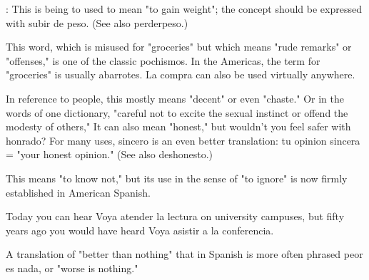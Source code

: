  : This is being to used to mean "to gain
weight"; the concept should be expressed with subir de peso. (See
also perderpeso.)

 This word, which is misused for "groceries" but
which means "rude remarks" or "offenses," is one of the classic pochismos. In the Americas, the term for "groceries" is usually abarrotes. La compra can also be used virtually anywhere.

 In reference to people, this mostly means "decent"
or even "chaste." Or in the words of one dictionary, "careful not to excite the sexual instinct or offend the modesty of others," It can also
mean "honest," but wouldn't you feel safer with honrado? For many
uses, sincero is an even better translation: tu opinion sincera = "your
honest opinion." (See also deshonesto.)

 This means "to know not," but its use in the sense
of "to ignore" is now firmly established in American Spanish.

 Today you can hear Voya atender la lectura on
university campuses, but fifty years ago you would have heard Voya
asistir a la conferencia.

 A translation of "better than nothing"
that in Spanish is more often phrased peor es nada, or "worse is
nothing."

